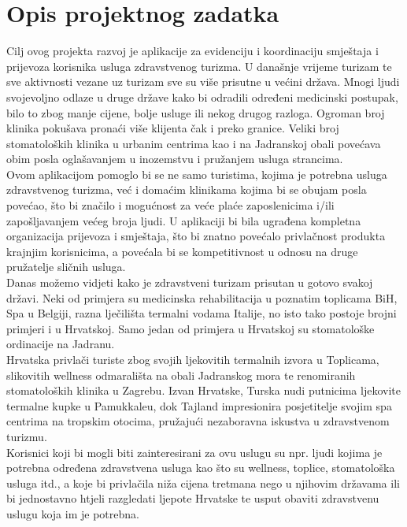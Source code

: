 \chapter{Opis projektnog zadatka}
		
		
		{Cilj ovog projekta razvoj je aplikacije za evidenciju i koordinaciju smještaja i prijevoza korisnika usluga zdravstvenog turizma. U današnje vrijeme turizam te sve aktivnosti vezane uz turizam sve su više prisutne u većini država. Mnogi ljudi svojevoljno odlaze u druge države kako bi odradili određeni medicinski postupak, bilo to zbog manje cijene, bolje usluge ili nekog drugog razloga. Ogroman broj klinika pokušava pronaći više klijenta čak i preko granice. Veliki broj stomatoloških klinika u urbanim centrima kao i na Jadranskoj obali povećava obim posla oglašavanjem u inozemstvu i pružanjem usluga strancima. \\ Ovom aplikacijom pomoglo bi se ne samo turistima, kojima je potrebna usluga zdravstvenog turizma, već i domaćim klinikama kojima bi se obujam posla povećao, što bi značilo i mogućnost za veće plaće zaposlenicima i/ili zapošljavanjem većeg broja ljudi. U aplikaciji bi bila ugrađena kompletna organizacija prijevoza i smještaja, što bi znatno povećalo privlačnost produkta krajnjim korisnicima, a povećala bi se kompetitivnost u odnosu na druge pružatelje sličnih usluga.}\\
		
		{Danas možemo vidjeti kako je zdravstveni turizam prisutan u gotovo svakoj državi. Neki od primjera su medicinska rehabilitacija u poznatim toplicama BiH, Spa u Belgiji, razna lječilišta termalni vodama Italije, no isto tako postoje brojni primjeri i u Hrvatskoj. Samo jedan od primjera u Hrvatskoj su stomatološke ordinacije na Jadranu.}\\
		
		{Hrvatska privlači turiste zbog svojih ljekovitih termalnih izvora u Toplicama, slikovitih wellness odmarališta na obali Jadranskog mora te renomiranih stomatoloških klinika u Zagrebu. Izvan Hrvatske, Turska nudi putnicima ljekovite termalne kupke u Pamukkaleu, dok Tajland impresionira posjetitelje svojim spa centrima na tropskim otocima, pružajući nezaboravna iskustva u zdravstvenom turizmu.}\\
		
		{Korisnici koji bi mogli biti zainteresirani za ovu uslugu su npr. ljudi kojima je potrebna određena zdravstvena usluga kao što su wellness, toplice, stomatološka usluga itd., a koje bi privlačila niža cijena tretmana nego u njihovim državama ili bi jednostavno htjeli razgledati ljepote Hrvatske te usput obaviti zdravstvenu uslugu koja im je potrebna. }\\
		
